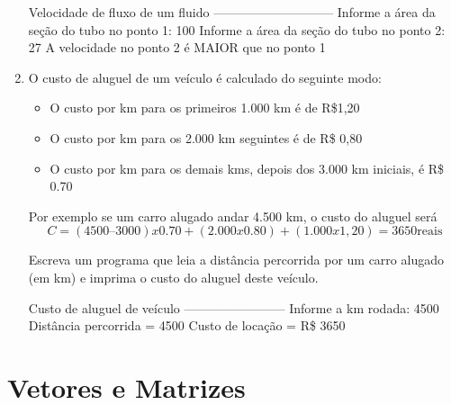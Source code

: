 \documentclass[11pt,fleqn]{practice}
\begin{document}
\begin{enumerate}
  \begin{runexample}
Velocidade de fluxo de um fluido
-----------------------------
Informe a área da seção do tubo no ponto 1: 100
Informe a área da seção do tubo no ponto 2: 27
A velocidade no ponto 2 é MAIOR que no ponto 1 
\end{runexample}


\item O custo de aluguel de um veículo é calculado do seguinte modo:
\begin{itemize}
    \item O custo por km para os primeiros 1.000 km é de R\$1,20
    \item O custo por km para os 2.000 km seguintes é de R\$ 0,80
    \item O custo por km para os demais kms, depois dos 3.000 km iniciais, é R\$ 0.70
\end{itemize}
Por exemplo se um carro alugado andar 4.500 km, o custo do aluguel será
\[ C = (4500 – 3000) x 0.70 + (2.000 x 0.80) + (1.000 x 1,20) = 3650 \text{reais} \]
 
Escreva um programa que leia a distância percorrida por um carro alugado (em km) e imprima o custo do aluguel deste veículo.

  \begin{runexample}
Custo de aluguel de veículo
------------------------
Informe a km rodada: 4500
Distância percorrida = 4500
Custo de locação = R\$ 3650
\end{runexample}

\end{enumerate}

\section{Vetores e Matrizes}
\end{document}
